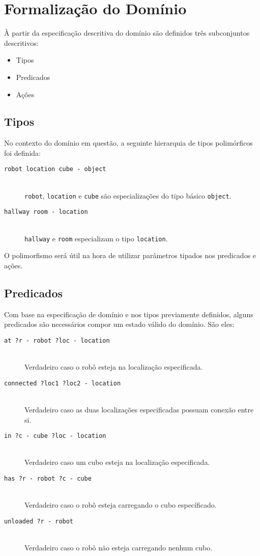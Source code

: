 \documentclass[letterpaper]{article}
\begin{document}
\section{Formalização do Domínio}

À partir da especificação descritiva do domínio são definidos três subconjuntos descritivos:

\begin{itemize}
\item Tipos
\item Predicados
\item Ações
\end{itemize}

\subsection{Tipos}

No contexto do domínio em questão, a seguinte hierarquia de tipos polimórficos foi definida:

\begin{description}
\item[\texttt{robot location cube - object}] \hfill\\ \texttt{robot}, \texttt{location} e \texttt{cube} são especializações do tipo básico \texttt{object}.
\item[\texttt{hallway room - location}] \hfill\\ \texttt{hallway} e \texttt{room} especializam o tipo \texttt{location}.
\end{description}

O polimorfismo será útil na hora de utilizar parâmetros tipados nos predicados e ações.

\subsection{Predicados}

Com base na especificação de domínio e nos tipos previamente definidos, alguns predicados são necessários compor um estado válido do domínio. São eles:

\begin{description}
\item[\texttt{at ?r - robot ?loc - location}] \hfill\\ Verdadeiro caso o robô esteja na localização especificada.
\item[\texttt{connected ?loc1 ?loc2 - location}] \hfill\\ Verdadeiro caso as duas localizações especificadas possuam conexão entre si.
\item[\texttt{in ?c - cube ?loc - location}] \hfill\\ Verdadeiro caso um cubo esteja na localização especificada.
\item[\texttt{has ?r - robot ?c - cube}] \hfill\\ Verdadeiro caso o robô esteja carregando o cubo específicado.
\item[\texttt{unloaded ?r - robot}] \hfill\\ Verdadeiro caso o robô não esteja carregando nenhum cubo.
\end{description}
\end{document}
